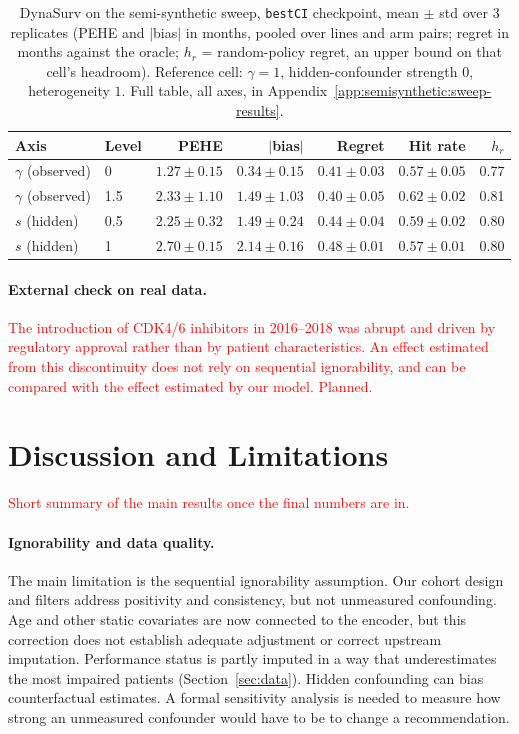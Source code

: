 \documentclass[a4paper,10pt]{article}
\newcommand{\todo}[1]{\textcolor{red}{#1}}
\begin{document}
\begin{table}[ht]
\centering\small
\caption{DynaSurv on the semi-synthetic sweep, \texttt{bestCI} checkpoint, mean $\pm$ std over 3 replicates (PEHE and $|$bias$|$ in months, pooled over lines and arm pairs; regret in months against the oracle; $h_r$ = random-policy regret, an upper bound on that cell's headroom). Reference cell: $\gamma=1$, hidden-confounder strength $0$, heterogeneity $1$. Full table, all axes, in Appendix~\ref{app:semisynthetic:sweep-results}.}
\label{tab:counterfactual-sweep}
\begin{tabular}{@{}llrrrrr@{}}
\toprule
Axis & Level & PEHE & $|$bias$|$ & Regret & Hit rate & $h_r$ \\
\midrule
$\gamma$ (observed) & 0 & $1.27\pm0.15$ & $0.34\pm0.15$ & $0.41\pm0.03$ & $0.57\pm0.05$ & 0.77 \\
$\gamma$ (observed) & 1.5 & $2.33\pm1.10$ & $1.49\pm1.03$ & $0.40\pm0.05$ & $0.62\pm0.02$ & 0.81 \\
$s$ (hidden) & 0.5 & $2.25\pm0.32$ & $1.49\pm0.24$ & $0.44\pm0.04$ & $0.59\pm0.02$ & 0.80 \\
$s$ (hidden) & 1 & $2.70\pm0.15$ & $2.14\pm0.16$ & $0.48\pm0.01$ & $0.57\pm0.01$ & 0.80 \\
\bottomrule
\end{tabular}
\end{table}

\paragraph{External check on real data.} \todo{The introduction of CDK4/6 inhibitors in 2016--2018 was abrupt and driven by regulatory approval rather than by patient characteristics. An effect estimated from this discontinuity does not rely on sequential ignorability, and can be compared with the effect estimated by our model. Planned.}

\section{Discussion and Limitations}
\label{sec:discussion}

\todo{Short summary of the main results once the final numbers are in.}

\paragraph{Ignorability and data quality.} The main limitation is the sequential ignorability assumption. Our cohort design and filters address positivity and consistency, but not unmeasured confounding. Age and other static covariates are now connected to the encoder, but this correction does not establish adequate adjustment or correct upstream imputation. Performance status is partly imputed in a way that underestimates the most impaired patients (Section~\ref{sec:data}). Hidden confounding can bias counterfactual estimates. A formal sensitivity analysis is needed to measure how strong an unmeasured confounder would have to be to change a recommendation.
\end{document}
